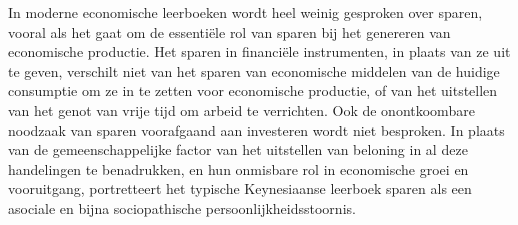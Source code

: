 \documentclass[
  a5paper,
  smalldemyvopaper,11pt,twoside,onecolumn,openright,extrafontsizes,
hidelinks]{memoir}
\begin{document}
In moderne economische leerboeken wordt heel weinig gesproken over
sparen, vooral als het gaat om de essentiële rol van sparen bij het
genereren van economische productie. Het sparen in financiële
instrumenten, in plaats van ze uit te geven, verschilt niet van het
sparen van economische middelen van de huidige consumptie om ze in te
zetten voor economische productie, of van het uitstellen van het genot
van vrije tijd om arbeid te verrichten. Ook de onontkoombare noodzaak
van sparen voorafgaand aan investeren wordt niet besproken. In plaats
van de gemeenschappelijke factor van het uitstellen van beloning in al
deze handelingen te benadrukken, en hun onmisbare rol in economische
groei en vooruitgang, portretteert het typische Keynesiaanse leerboek
sparen als een asociale en bijna sociopathische
persoonlijkheidsstoornis.
\end{document}
